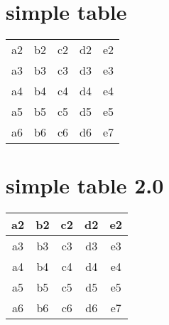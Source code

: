 \documentclass[10pt]{article}
\begin{document}
\section{simple table}
\begin{center}
    \begin{tabular}{ | c| c| c| c| c | }
     \hline
    a2 & b2 & c2 & d2 & e2 \\ 
    a3 & b3 & c3 & d3 & e3 \\ 
    a4 & b4 & c4 & d4 & e4 \\ 
    a5 & b5 & c5 & d5 & e5 \\ 
    a6 & b6 & c6 & d6 & e7 \\ 
    \hline
    \end{tabular}
\end{center}

\section{simple table 2.0}
\begin{center}
    \begin{tabular}{ | c| c| c| c| c| }
     \hline
    a2 & b2 & c2 & d2 & e2 \\ 
     \hline 
    a3 & b3 & c3 & d3 & e3 \\ 
     \hline 
    a4 & b4 & c4 & d4 & e4 \\ 
     \hline 
    a5 & b5 & c5 & d5 & e5 \\ 
     \hline 
    a6 & b6 & c6 & d6 & e7 \\ 
     \hline 
    \end{tabular}
\end{center}
 
\end{document}
